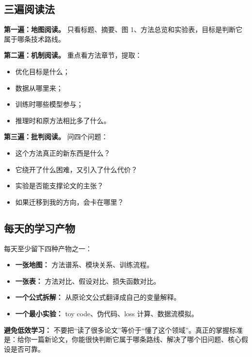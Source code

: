 \subsection{三遍阅读法}

\textbf{第一遍：地图阅读。}
只看标题、摘要、图 1、方法总览和实验表，目标是判断它属于哪条技术路线。

\textbf{第二遍：机制阅读。}
重点看方法章节，提取：
\begin{itemize}[leftmargin=1.5em]
  \item 优化目标是什么；
  \item 数据从哪里来；
  \item 训练时哪些模型参与；
  \item 推理时和原方法相比多了什么。
\end{itemize}

\textbf{第三遍：批判阅读。}
问四个问题：
\begin{itemize}[leftmargin=1.5em]
  \item 这个方法真正的新东西是什么？
  \item 它绕开了什么困难，又引入了什么代价？
  \item 实验是否能支撑论文的主张？
  \item 如果迁移到我的方向，会卡在哪里？
\end{itemize}

\subsection{每天的学习产物}

每天至少留下四种产物之一：

\begin{itemize}[leftmargin=1.5em]
  \item \textbf{一张地图：} 方法谱系、模块关系、训练流程。
  \item \textbf{一张表：} 方法对比、假设对比、损失函数对比。
  \item \textbf{一个公式拆解：} 从原论文公式翻译成自己的变量解释。
  \item \textbf{一个最小实验：} toy code、伪代码、loss 计算、数据流模拟。
\end{itemize}

\begin{warnbox}
\textbf{避免低效学习：} 不要把“读了很多论文”等价于“懂了这个领域”。真正的掌握标准是：给你一篇新论文，你能很快判断它属于哪条路线、解决了哪个旧问题、核心假设是否可靠。
\end{warnbox}
